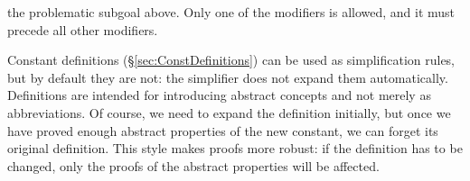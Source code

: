 \begin{isabellebody}
\begin{isamarkuptext}
the problematic subgoal above.
Only one of the modifiers is allowed, and it must precede all
other modifiers.
\end{isamarkuptext}%
\isamarkuptrue%
%
\isamarkuptrue%
%
\begin{isamarkuptext}%
\label{sec:Simp-with-Defs}
Constant definitions (\S\ref{sec:ConstDefinitions}) can be used as
simplification rules, but by default they are not: the simplifier does not
expand them automatically.  Definitions are intended for introducing abstract
concepts and not merely as abbreviations.  Of course, we need to expand
the definition initially, but once we have proved enough abstract properties
of the new constant, we can forget its original definition.  This style makes
proofs more robust: if the definition has to be changed,
only the proofs of the abstract properties will be affected.


\end{isamarkuptext}
\end{isabellebody}
